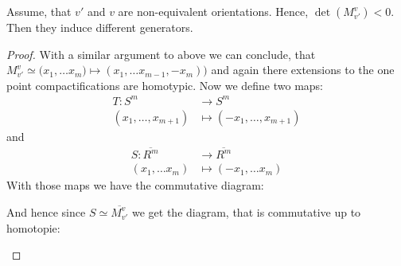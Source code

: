 \begin{lemma}
    Assume, that $v'$ and $v$ are non-equivalent orientations. Hence, $\det(M^v_{v'})<0$. Then they induce different generators.
\end{lemma}
\begin{proof}
    With a similar argument to above we can conclude, that $M^v_{v'}\simeq \Big(x_1,\dots x_m)\mapsto (x_1,\dots x_{m-1},-x_m)\big)$ and again there extensions to the one point compactifications are homotypic.
    Now we define two maps: 
    \begin{align*}
        T: S^m &\to S^m \\
        (x_1,\dots,x_{m+1})&  \mapsto (-x_1,\dots,x_{m+1})
    \end{align*}
    and
    \begin{align*}
        S:\overline{R^m} & \to \overline{R^m} \\
        (x_1,\dots x_m)  &\mapsto (-x_1,\dots x_m)
    \end{align*}
    With those maps we have the commutative diagram: 
    \begin{center}
    \end{center}
    And hence since $S\simeq \overline{M^v_{v'}}$ we get the diagram, that is commutative up to homotopie:
\begin{center}
\end{center}
\end{proof}

